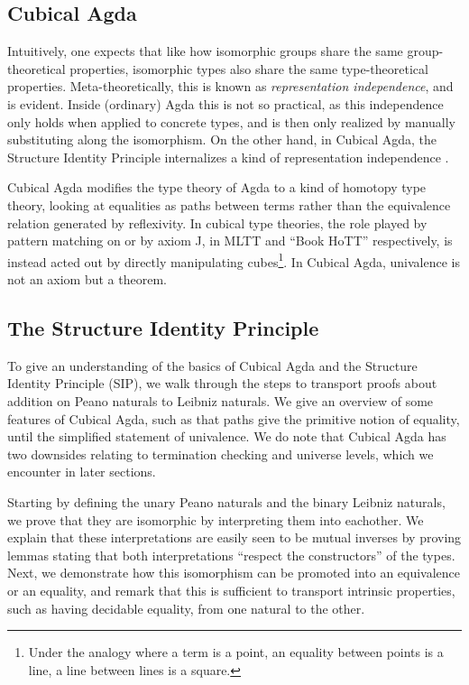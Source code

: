 \subsection{Cubical Agda}
Intuitively, one expects that like how isomorphic groups share the same group-theoretical properties, isomorphic types also share the same type-theoretical properties. Meta-theoretically, this is known as \emph{representation independence}, and is evident. Inside (ordinary) Agda this is not so practical, as this independence only holds when applied to concrete types, and is then only realized by manually substituting along the isomorphism. On the other hand, in Cubical Agda, the Structure Identity Principle internalizes a kind of representation independence \cite{iri}.

Cubical Agda modifies the type theory of Agda to a kind of homotopy type theory, looking at equalities as paths between terms rather than the equivalence relation generated by reflexivity. In cubical type theories, the role played by pattern matching on  or by axiom J, in MLTT and ``Book HoTT'' respectively, is instead acted out by directly manipulating cubes\footnote{Under the analogy where a term is a point, an equality between points is a line, a line between lines is a square.}. In Cubical Agda, univalence
is not an axiom but a theorem.




\subsection{The Structure Identity Principle}\label{sec:leibniz}
To give an understanding of the basics of Cubical Agda \cite{cuagda} and the Structure Identity Principle (SIP), we walk through the steps to transport proofs about addition on Peano naturals to Leibniz naturals. We give an overview of some features of Cubical Agda, such as that paths give the primitive notion of equality, until the simplified statement of univalence. We do note that Cubical Agda has two downsides relating to termination checking and universe levels, which we encounter in later sections.

Starting by defining the unary Peano naturals and the binary Leibniz naturals, we prove that they are isomorphic by interpreting them into eachother. We explain that these interpretations are easily seen to be mutual inverses by proving lemmas stating that both interpretations ``respect the constructors'' of the types. Next, we demonstrate how this isomorphism can be promoted into an equivalence or an equality, and remark that this is sufficient to transport intrinsic properties, such as having decidable equality, from one natural to the other.

